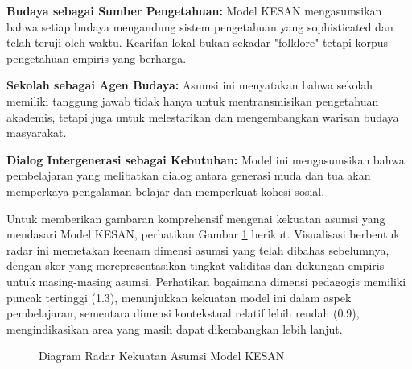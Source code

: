 \documentclass[12pt,a4paper,oneside]{book}
\begin{document}
\textbf{Budaya sebagai Sumber Pengetahuan:} Model KESAN mengasumsikan bahwa setiap budaya mengandung sistem pengetahuan yang sophisticated dan telah teruji oleh waktu. Kearifan lokal bukan sekadar "folklore" tetapi korpus pengetahuan empiris yang berharga.

\textbf{Sekolah sebagai Agen Budaya:} Asumsi ini menyatakan bahwa sekolah memiliki tanggung jawab tidak hanya untuk mentransmisikan pengetahuan akademis, tetapi juga untuk melestarikan dan mengembangkan warisan budaya masyarakat.

\textbf{Dialog Intergenerasi sebagai Kebutuhan:} Model ini mengasumsikan bahwa pembelajaran yang melibatkan dialog antara generasi muda dan tua akan memperkaya pengalaman belajar dan memperkuat kohesi sosial.

Untuk memberikan gambaran komprehensif mengenai kekuatan asumsi yang mendasari Model KESAN, perhatikan Gambar \ref{fig:asumsi_validitas} berikut. Visualisasi berbentuk radar ini memetakan keenam dimensi asumsi yang telah dibahas sebelumnya, dengan skor yang merepresentasikan tingkat validitas dan dukungan empiris untuk masing-masing asumsi. Perhatikan bagaimana dimensi pedagogis memiliki puncak tertinggi (1.3), menunjukkan kekuatan model ini dalam aspek pembelajaran, sementara dimensi kontekstual relatif lebih rendah (0.9), mengindikasikan area yang masih dapat dikembangkan lebih lanjut.

\begin{figure}[H]
  \centering
  \caption{Diagram Radar Kekuatan Asumsi Model KESAN}
  \label{fig:asumsi_validitas}
\end{figure}
\end{document}
